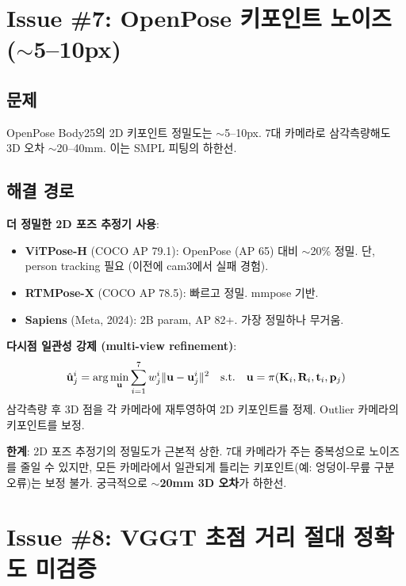 \documentclass[11pt, a4paper]{report}
\begin{document}
\section{Issue \#7: OpenPose 키포인트 노이즈 ($\sim$5--10px)}

\subsection{문제}
OpenPose Body25의 2D 키포인트 정밀도는 $\sim$5--10px. 7대 카메라로 삼각측량해도 3D 오차 $\sim$20--40mm. 이는 SMPL 피팅의 하한선.

\subsection{해결 경로}

\begin{ossbox}
\textbf{더 정밀한 2D 포즈 추정기 사용}:
\begin{itemize}[leftmargin=*]
  \item \textbf{ViTPose-H} (COCO AP 79.1): OpenPose (AP 65) 대비 $\sim$20\% 정밀. 단, person tracking 필요 (이전에 cam3에서 실패 경험).
  \item \textbf{RTMPose-X} (COCO AP 78.5): 빠르고 정밀. mmpose 기반.
  \item \textbf{Sapiens} (Meta, 2024): 2B param, AP 82+. 가장 정밀하나 무거움.
\end{itemize}
\end{ossbox}

\begin{mathbox}
\textbf{다시점 일관성 강제 (multi-view refinement)}:
\begin{equation}
\hat{\mathbf{u}}_j^i = \arg\min_{\mathbf{u}} \sum_{i=1}^{7} w_j^i \|\mathbf{u} - \mathbf{u}_j^i\|^2 \quad \text{s.t.} \quad \mathbf{u} = \pi(\mathbf{K}_i, \mathbf{R}_i, \mathbf{t}_i, \mathbf{p}_j)
\end{equation}
삼각측량 후 3D 점을 각 카메라에 재투영하여 2D 키포인트를 정제. Outlier 카메라의 키포인트를 보정.
\end{mathbox}

\begin{limitbox}
\textbf{한계}: 2D 포즈 추정기의 정밀도가 근본적 상한. 7대 카메라가 주는 중복성으로 노이즈를 줄일 수 있지만, 모든 카메라에서 일관되게 틀리는 키포인트(예: 엉덩이-무릎 구분 오류)는 보정 불가. 궁극적으로 \textbf{$\sim$20mm 3D 오차}가 하한선.
\end{limitbox}


\section{Issue \#8: VGGT 초점 거리 절대 정확도 미검증}
\end{document}
